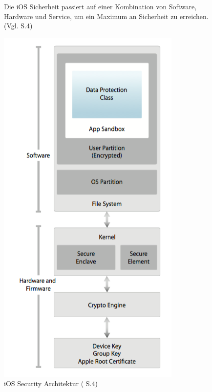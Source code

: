 \begin{figure}[htb]
\begin{minipage}{0.6\textwidth}
\begin{description}
   		\end{description}
Die iOS Sicherheit passiert auf einer Kombination von Software, Hardware und Service, um ein Maximum an Sicherheit zu erreichen. (Vgl. \cite{Apple[4]} S.4)
	\end{minipage}
	\hfil
	\begin{minipage}{0.4\textwidth}
		\includegraphics[width=\textwidth]{Bilder/Chapter3_SecArchitektur}
		\caption {iOS Security Architektur (\cite{Apple[4]} S.4)}
        \label{fig:iOS Security Architektur}
	\end{minipage}
\end{figure}
		    	
